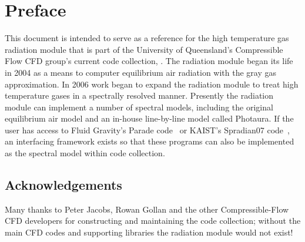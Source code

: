 \chapter*{Preface}

This document is intended to serve as a reference for the high temperature gas radiation module that is part of the University of Queensland's Compressible Flow CFD group's current code collection, \cite{cfcfd3}.
The radiation module began its life in 2004 as a means to computer equilibrium air radiation with the gray gas approximation.
In 2006 work began to expand the radiation module to treat high temperature gases in a spectrally resolved manner.
Presently the radiation module can implement a number of spectral models, including the original equilibrium air model and an in-house line-by-line model called Photaura.
If the user has access to Fluid Gravity's Parade code~\cite{PARADE} or KAIST's Spradian07 code~\cite{hyun_phd}, an interfacing framework exists so that these programs can also be implemented as the spectral model within code collection.  

\section*{Acknowledgements}

Many thanks to Peter Jacobs, Rowan Gollan and the other Compressible-Flow CFD developers for constructing and maintaining the code collection; without the main CFD codes and supporting libraries the radiation module would not exist!